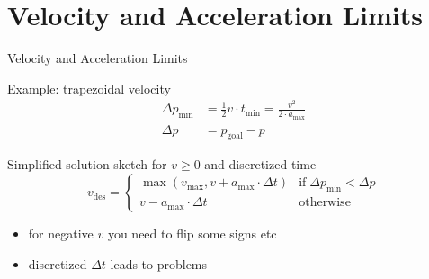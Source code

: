 \documentclass{beamer}
\begin{document}
\section{Velocity and Acceleration Limits}
\begin{frame}{Velocity and Acceleration Limits}
    
  \begin{minipage}{0.55\columnwidth}
    Example: trapezoidal velocity
    \begin{align*}
      \Delta p_\text{min}
      &=
      \frac{1}{2} v \cdot t_\text{min} = \frac{v^2}{2 \cdot a_\text{max}}
      \\
      \Delta p
      &=
      p_\text{goal} - p
    \end{align*}
    
  \end{minipage}
  \hfill
  \begin{minipage}{0.4\columnwidth}
    \def\svgwidth{\columnwidth}
    
  \end{minipage}
  
  \vfill
  
  Simplified solution sketch for $v \geq 0$ and discretized time
  \[
  v_\text{des}
  =
  \begin{cases}
    \max (v_\text{max}, v + a_\text{max} \cdot \Delta t)
    & \text{if}\; \Delta p_\text{min} < \Delta p
    \\
    v - a_\text{max} \cdot \Delta t
    & \text{otherwise}
  \end{cases}
  \]
  
  \begin{itemize}
  \item
    for negative $v$ you need to flip some signs etc
  \item
    discretized $\Delta t$ leads to problems
  \end{itemize}
  
\end{frame}
\end{document}
